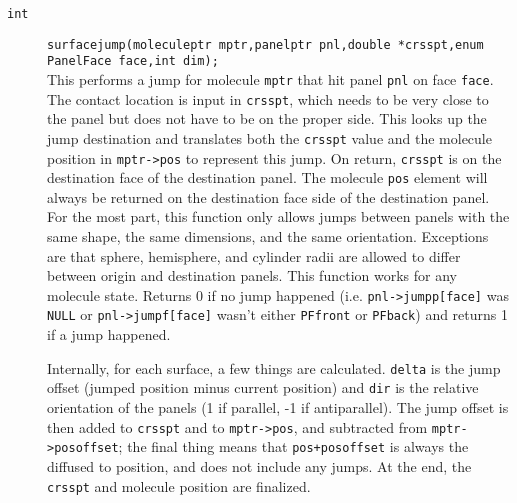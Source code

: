 \documentclass {book}
\newcommand {\ttt} {\texttt}
\begin{document}
\begin{description}
\item[\ttt{int}]
\ttt{surfacejump(moleculeptr mptr,panelptr pnl,double *crsspt,enum PanelFace face,int dim);}
\hfill \\
This performs a jump for molecule \ttt{mptr} that hit panel \ttt{pnl} on face \ttt{face}. The contact location is input in \ttt{crsspt}, which needs to be very close to the panel but does not have to be on the proper side. This looks up the jump destination and translates both the \ttt{crsspt} value and the molecule position in \ttt{mptr->pos} to represent this jump. On return, \ttt{crsspt} is on the destination face of the destination panel. The molecule \ttt{pos} element will always be returned on the destination face side of the destination panel. For the most part, this function only allows jumps between panels with the same shape, the same dimensions, and the same orientation. Exceptions are that sphere, hemisphere, and cylinder radii are allowed to differ between origin and destination panels. This function works for any molecule state. Returns 0 if no jump happened (i.e. \ttt{pnl->jumpp[face]} was \ttt{NULL} or \ttt{pnl->jumpf[face]} wasn't either \ttt{PFfront} or \ttt{PFback}) and returns 1 if a jump happened.

Internally, for each surface, a few things are calculated. \ttt{delta} is the jump offset (jumped position minus current position) and \ttt{dir} is the relative orientation of the panels (1 if parallel, -1 if antiparallel). The jump offset is then added to \ttt{crsspt} and to \ttt{mptr->pos}, and subtracted from \ttt{mptr->posoffset}; the final thing means that \ttt{pos+posoffset} is always the diffused to position, and does not include any jumps. At the end, the \ttt{crsspt} and molecule position are finalized.


\end{description}
\end{document}
